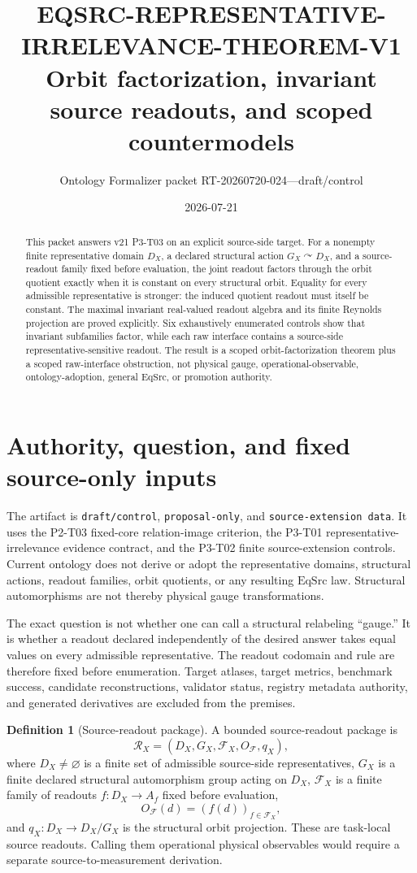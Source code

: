 \documentclass[11pt]{article}
\title{EQSRC-REPRESENTATIVE-IRRELEVANCE-THEOREM-V1\\
Orbit factorization, invariant source readouts, and scoped countermodels}
\author{Ontology Formalizer packet RT-20260720-024---draft/control}
\date{2026-07-21}
\theoremstyle{definition}
\newtheorem{definition}[theorem]{Definition}
\newcommand{\EqSrc}{\ensuremath{\mathrm{EqSrc}}}
\begin{document}
\maketitle

\begin{abstract}
This packet answers v21 P3-T03 on an explicit source-side target.  For a
nonempty finite representative domain $D_X$, a declared structural action
$G_X\curvearrowright D_X$, and a source-readout family fixed before
evaluation, the joint readout factors through the orbit quotient exactly when
it is constant on every structural orbit.  Equality for every admissible
representative is stronger: the induced quotient readout must itself be
constant.  The maximal invariant real-valued readout algebra and its finite
Reynolds projection are proved explicitly.  Six exhaustively enumerated
controls show that invariant subfamilies factor, while each raw interface
contains a source-side representative-sensitive readout.  The result is a
scoped orbit-factorization theorem plus a scoped raw-interface obstruction,
not physical gauge, operational-observable, ontology-adoption, general
\EqSrc{}, or promotion authority.
\end{abstract}

\section{Authority, question, and fixed source-only inputs}

The artifact is \texttt{draft/control}, \texttt{proposal-only}, and
\texttt{source-extension data}.  It uses the P2-T03 fixed-core relation-image
criterion, the P3-T01 representative-irrelevance evidence contract, and the
P3-T02 finite source-extension controls.  Current ontology does not derive or
adopt the representative domains, structural actions, readout families, orbit
quotients, or any resulting \EqSrc{} law.  Structural automorphisms are not thereby physical gauge transformations.

The exact question is not whether one can call a structural relabeling
``gauge.''  It is whether a readout declared independently of the desired
answer takes equal values on every admissible representative.  The readout
codomain and rule are therefore fixed before enumeration.  Target atlases,
target metrics, benchmark success, candidate reconstructions, validator
status, registry metadata authority, and generated derivatives are excluded
from the premises.

\begin{definition}[Source-readout package]
A bounded source-readout package is
\[
  \mathcal R_X=(D_X,G_X,\mathcal F_X,O_{\mathcal F},q_X),
\]
where $D_X\neq\varnothing$ is a finite set of admissible source-side
representatives, $G_X$ is a finite declared structural automorphism group
acting on $D_X$, $\mathcal F_X$ is a finite family of readouts
$f:D_X\to A_f$ fixed before evaluation,
\[
  O_{\mathcal F}(d)=(f(d))_{f\in\mathcal F_X},
\]
and $q_X:D_X\to D_X/G_X$ is the structural orbit projection.  These are
task-local source readouts.  Calling them operational physical observables
would require a separate source-to-measurement derivation.
\end{definition}
\end{document}
